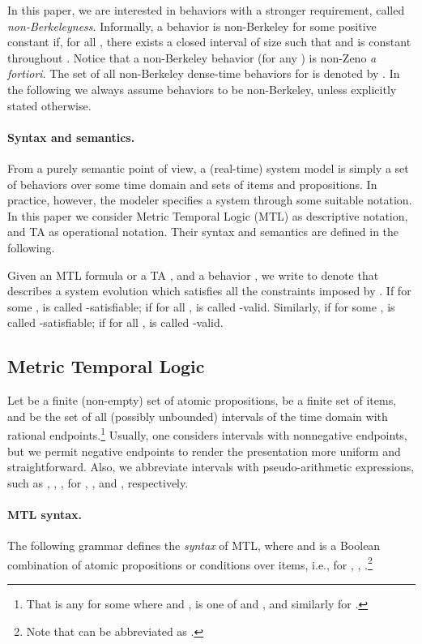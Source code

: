 \documentclass[a4paper]{article}
\theoremstyle{plain}
\theoremstyle{definition}
\begin{document}
In this paper, we are interested in behaviors with a stronger requirement, called \emph{non-Berkeleyness}.
Informally, a behavior  is non-Berkeley for some positive constant  if, for all , there exists a closed interval  of size  such that  and  is constant throughout .
Notice that a non-Berkeley behavior (for any ) is non-Zeno \emph{a fortiori}. The set of all non-Berkeley dense-time behaviors for  is denoted by .
In the following we always assume behaviors to be non-Berkeley, unless explicitly stated otherwise.




\paragraph{Syntax and semantics.}
From a purely semantic point of view, a (real-time) system model is simply a set of behaviors \cite{AH92b,FMMR07-TR2007-22} over some time domain  and sets of items and propositions.
In practice, however, the modeler specifies a system through some suitable notation.
In this paper we consider Metric Temporal Logic (MTL) \cite{Koy90,AH93} as descriptive notation, and TA \cite{AD94,AFH96} as operational notation.
Their syntax and semantics are defined in the following.

Given an MTL formula or a TA , and a behavior , we write  to denote that  describes a system evolution which satisfies all the constraints imposed by .
If  for some ,  is called -satisfiable; if  for all ,  is called -valid.
Similarly, if  for some ,  is called -satisfiable; if  for all ,  is called -valid.







\subsection{Metric Temporal Logic}
Let  be a finite (non-empty) set of atomic propositions,  be a finite set of items, and  be the set of all (possibly unbounded) intervals of the time domain  with rational endpoints.\footnote{That is any  for some  where  and ,  is one of  and , and similarly for .}
Usually, one considers intervals with nonnegative endpoints, but we permit negative endpoints to render the presentation more uniform and straightforward.
Also, we abbreviate intervals with pseudo-arithmetic expressions, such as , , , for , , and , respectively.


\paragraph{MTL syntax.}
The following grammar defines the \emph{syntax} of MTL, where  and  is a Boolean combination of atomic propositions or conditions over items, i.e.,  for , , .\footnote{Note that  can be abbreviated as .}
\end{document}
